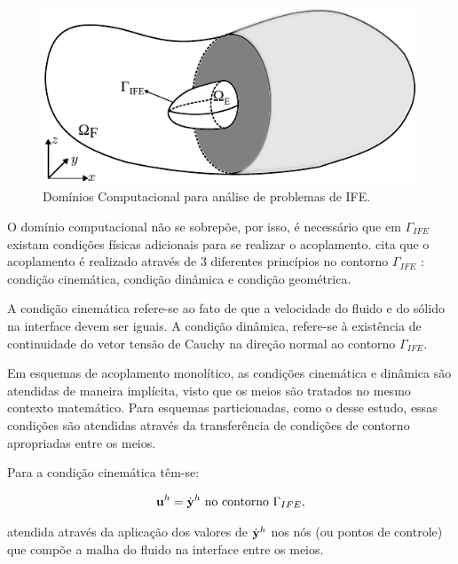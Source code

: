 \documentclass[tese_patricia]{subfiles}
\begin{document}
\begin{figure}[htb!]
	\centering 
	\includegraphics[scale=1.0,trim=0cm 0cm 0cm 0.0cm, clip=true]{Imagens/Cap7/dominio.pdf}	
	\caption{Domínios Computacional para análise de problemas de IFE.}
	\label{fig:dominios}
\end{figure}

O domínio computacional não se sobrepõe, por isso, é necessário que em $\Gamma_{IFE}$ existam condições físicas adicionais para se realizar o acoplamento.  cita que o acoplamento é realizado através de 3 diferentes princípios no contorno $\Gamma_{IFE}$ : condição cinemática, condição dinâmica e condição geométrica.

A condição cinemática refere-se ao fato de que a velocidade do fluido e do sólido na interface devem ser iguais. A condição dinâmica, refere-se à existência de continuidade do vetor tensão de Cauchy na direção normal ao contorno $\Gamma_{IFE}$.

Em esquemas de acoplamento monolítico, as condições cinemática e dinâmica são atendidas de maneira implícita, visto que os meios são tratados no mesmo contexto matemático. Para esquemas particionadas, como o desse estudo, essas condições são atendidas através da transferência de condições de contorno apropriadas entre os meios.

Para a condição cinemática têm-se:

\begin{align}
	\mathbf{u}^h = \dot{\mathbf{y}}^h \ \textrm{no contorno} \ \Gamma_{IFE},
\end{align}

\noindent atendida através da aplicação dos valores de $\dot{\mathbf{y}}^h$ nos nós (ou pontos de controle) que compõe a malha do fluido na interface entre os meios.
\end{document}

